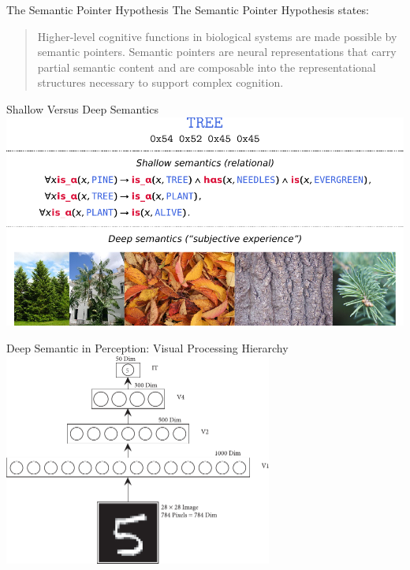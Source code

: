 \documentclass[handout,aspectratio=169]{beamer}
\begin{document}
  \begin{frame}{The Semantic Pointer Hypothesis}
    The Semantic Pointer Hypothesis states: \\ [0.5cm]
    \begin{quote}
    Higher-level cognitive functions in biological systems are made possible by semantic pointers. Semantic pointers are neural representations that carry partial semantic content and are composable into the representational structures necessary to support complex cognition.
    \end{quote}
	\end{frame}


	\begin{frame}{Shallow Versus Deep Semantics}
		\includegraphics[width=\textwidth]{media/shallow_vs_deep_semantics.pdf}
	\end{frame}

	\begin{frame}{Deep Semantic in Perception: Visual Processing Hierarchy}
		\centering
		\includegraphics[width=0.66\textwidth]{media/htbab_hierarchy.pdf}
	\end{frame}
\end{document}

